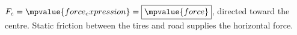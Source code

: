 $F_{\mathrm c}=\mpvalue{force_expression}=\boxed{\mpvalue{force}}$, directed toward the centre.
Static friction between the tires and road supplies the horizontal force.
